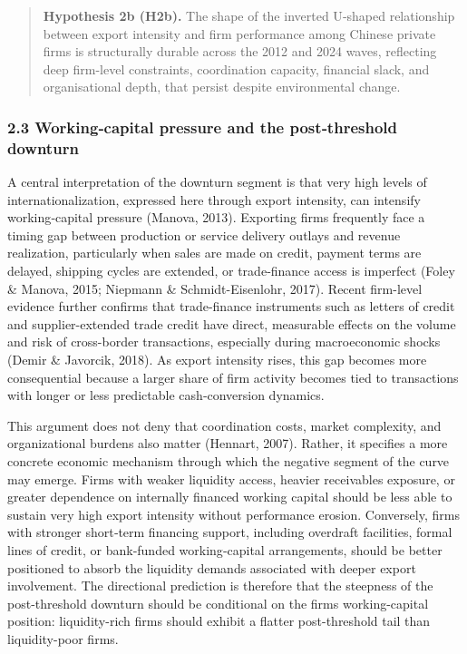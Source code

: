 \documentclass[12pt,a4paper]{article}
\begin{document}
\begin{quote}
\textbf{Hypothesis 2b (H2b).} The shape of the inverted U‑shaped
relationship between export intensity and firm performance among Chinese
private firms is structurally durable across the 2012 and 2024 waves,
reflecting deep firm-level constraints, coordination capacity, financial
slack, and organisational depth, that persist despite environmental
change.
\end{quote}

\hypertarget{23-workingcapital-pressure-and-the-postthreshold-downturn}{%
\subsubsection{2.3 Working‑capital pressure and the post‑threshold
downturn}\label{23-workingcapital-pressure-and-the-postthreshold-downturn}}

A central interpretation of the downturn segment is that very high
levels of internationalization, expressed here through export intensity,
can intensify working‑capital pressure (Manova, 2013). Exporting firms
frequently face a timing gap between production or service delivery
outlays and revenue realization, particularly when sales are made on
credit, payment terms are delayed, shipping cycles are extended, or
trade‑finance access is imperfect (Foley \& Manova, 2015; Niepmann \&
Schmidt-Eisenlohr, 2017). Recent firm-level evidence further confirms
that trade-finance instruments such as letters of credit and
supplier-extended trade credit have direct, measurable effects on the
volume and risk of cross-border transactions, especially during
macroeconomic shocks (Demir \& Javorcik, 2018). As export intensity
rises, this gap becomes more consequential because a larger share of
firm activity becomes tied to transactions with longer or less
predictable cash‑conversion dynamics.

This argument does not deny that coordination costs, market complexity,
and organizational burdens also matter (Hennart, 2007). Rather, it
specifies a more concrete economic mechanism through which the negative
segment of the curve may emerge. Firms with weaker liquidity access,
heavier receivables exposure, or greater dependence on internally
financed working capital should be less able to sustain very high export
intensity without performance erosion. Conversely, firms with stronger
short‑term financing support, including overdraft facilities, formal
lines of credit, or bank‑funded working‑capital arrangements, should be
better positioned to absorb the liquidity demands associated with deeper
export involvement. The directional prediction is therefore that the
steepness of the post-threshold downturn should be conditional on the
firm\textquotesingle s working-capital position: liquidity-rich firms
should exhibit a flatter post-threshold tail than liquidity-poor firms.
\end{document}
